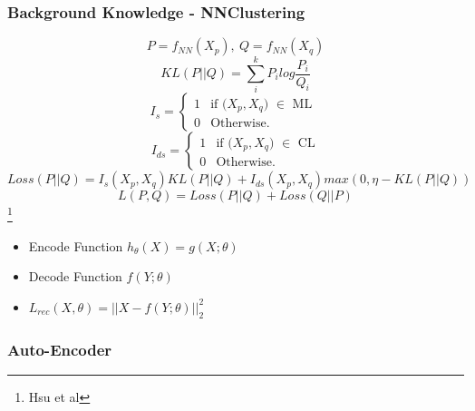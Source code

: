 \documentclass{beamer}
\begin{document}
\begin{frame}
\frametitle{Background Knowledge - NNClustering}
\begin{equation*}
  P = f_{NN}(X_p), ~ Q = f_{NN}(X_q)
\end{equation*}
\pause
\begin{equation*}
  KL(P||Q) = \sum_i^k P_ilog\frac{P_i}{Q_i}
\end{equation*}
\pause
\begin{equation*}
  I_s = \left\{
\begin{array}{ll}
  1 & \mbox{if ($X_p, X_q$) $\in$ ML }\\
  0 & \mbox{Otherwise.}
\end{array}
\right.
\end{equation*}
%
\begin{equation*}
  I_{ds} = \left\{
\begin{array}{ll}
  1 & \mbox{if ($X_p, X_q$) $\in$ CL}\\
  0 & \mbox{Otherwise.}
\end{array}
\right.
\end{equation*}
\begin{equation*}
  Loss(P || Q) = I_s(X_p, X_q)KL(P || Q) + I_{ds}(X_p, X_q)max(0,
  \eta-KL(P||Q))
\end{equation*}
\begin{equation*}
  L(P,Q) = Loss(P || Q) + Loss(Q || P)
\end{equation*}
\footnote{Hsu et al}
\end{frame}

\begin{frame}
\begin{itemize}
  \setlength\itemsep{1em}
\item Encode Function $h_{\theta}(X) = g(X; \theta)$
\item Decode Function $f(Y; \theta)$
\item $L_{rec}(X, \theta) = || X - f(Y; \theta)||_2^2$
\end{itemize}
  \frametitle{Auto-Encoder}
  \begin{figure}[!h]
    \centering
    \label{fig:AE}
  \end{figure}
\end{frame}
\end{document}
